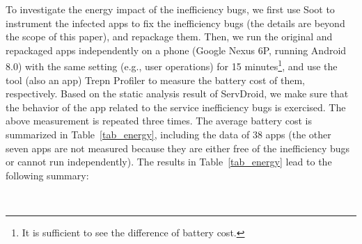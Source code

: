 \documentclass[sigconf,review, anonymous]{acmart}
\begin{document}
To investigate the energy impact of the inefficiency bugs, we first use
\textsf{Soot} to instrument the infected apps to fix the inefficiency bugs (the details are beyond the scope of this paper), and
repackage them. Then, we run the original and repackaged apps independently on a
phone (Google Nexus 6P, running Android 8.0) with the same setting (e.g., user operations) for 15 minutes\footnote{It is sufficient to see the difference of battery cost.}, and use the tool (also an app)
\textsf{Trepn Profiler} to measure the battery cost of them, respectively. Based
on the static analysis result of \textsf{ServDroid}, we make sure that the behavior of the app related to the service inefficiency bugs is exercised. The above measurement is repeated three times. The average battery cost is summarized in Table~\ref{tab_energy}, including the data of 38 apps (the other seven
apps are not measured because they are either free of the inefficiency bugs or cannot run
independently).
The results in Table~\ref{tab_energy} lead to the following summary:

\medskip
{\setlength{\parindent}{0 em}
}\\
\medskip
\end{document}
